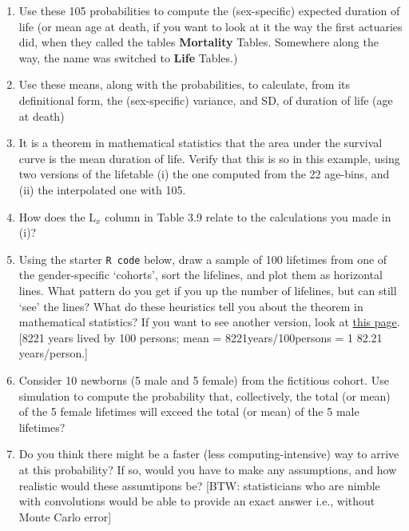 \documentclass[]{book}
\providecommand{\tightlist}{%
  \setlength{\itemsep}{0pt}\setlength{\parskip}{0pt}}
\begin{document}
\begin{enumerate}
\def\labelenumi{\arabic{enumi}.}
\tightlist
\item
  Use these 105 probabilities to compute the (sex-specific) expected duration of life (or mean age at death, if you want to look at it the way the first actuaries did, when they called the tables \textbf{Mortality} Tables. Somewhere along the way, the name was switched to \textbf{Life} Tables.)
\item
  Use these means, along with the probabilities, to calculate, from its definitional form, the (sex-specific) variance, and SD, of duration of life (age at death)
\item
  It is a theorem in mathematical statistics that the area under the survival curve is the mean duration of life. Verify that this is so in this example, using two versions of the lifetable (i) the one computed from the 22 age-bins, and (ii) the interpolated one with 105.
\item
  How does the L\(_x\) column in Table 3.9 relate to the calculations you made in (i)?
\item
  Using the starter \texttt{R\ code} below, draw a sample of 100 lifetimes from one of the gender-specific `cohorts', sort the lifelines, and plot them as horizontal lines. What pattern do you get if you up the number of lifelines, but can still `see' the lines? What do these heuristics tell you about the theorem in mathematical statistics? If you want to see another version, look at \href{http://www.medicine.mcgill.ca/epidemiology/hanley/bios601/ch04.pdf\#page=8}{this page}. {[}8221 years lived by 100 persons; mean = 8221years/100persons = 1 82.21 years/person.{]}\\
\item
  Consider 10 newborns (5 male and 5 female) from the fictitious cohort. Use simulation to compute the probability that, collectively, the total (or mean) of the 5 female lifetimes will exceed the total (or mean) of the 5 male lifetimes?
\item
  Do you think there might be a faster (less computing-intensive) way to arrive at this probability? If so, would you have to make any assumptions, and how realistic would these assumtipons be? {[}BTW: statisticians who are nimble with convolutions would be able to provide an exact answer i.e., without Monte Carlo error{]}
\end{enumerate}
\end{document}
